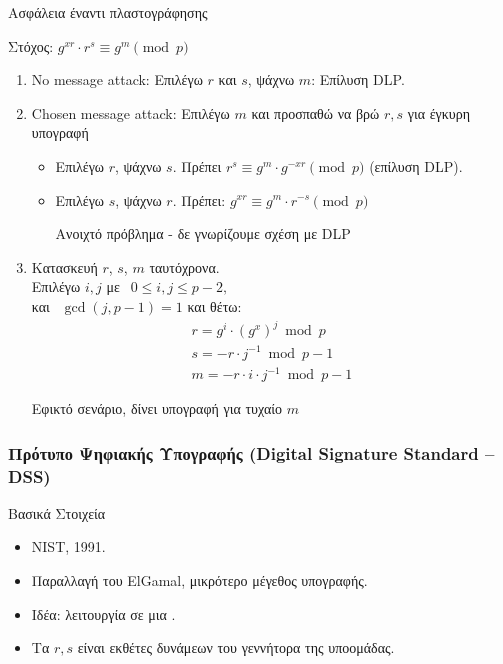 \documentclass{beamer}
\begin{document}
\begin{frame}[allowframebreaks]{Ασφάλεια έναντι πλαστογράφησης}

\alert{Στόχος: $g^{xr} \cdot r^s \equiv g^{m} \pmod p$}

\begin{enumerate}
\item No message attack: Επιλέγω $r$ και $s$, ψάχνω $m$: Επίλυση DLP.

\item Chosen message attack: Επιλέγω $m$ και προσπαθώ να βρώ $r,s$ για έγκυρη υπογραφή
\begin{itemize}
\item Επιλέγω $r$, ψάχνω $s$. Πρέπει
$r^s \equiv g^{m} \cdot g^{-xr} \pmod p$ (επίλυση DLP).

\item Επιλέγω $s$, ψάχνω $r$. Πρέπει:
$g^{xr}  \equiv g^{m} \cdot r^{-s} \pmod p$

Ανοιχτό πρόβλημα - δε γνωρίζουμε σχέση με DLP 
\end{itemize}
 
 
\framebreak

\item Κατασκευή $r$, $s$, $m$ ταυτόχρονα.\\
Επιλέγω $i,j$
με $ \ \ 0\leq i,j \leq p-2, $\\
και $ \ \  \gcd(j,p-1)=1$  και θέτω: \\
\begin{align*}
 r=g^{i} \cdot (g^{x})^j \bmod p \\
 s = -r\cdot j^{-1} \bmod {p-1} \\
 m = -r\cdot i\cdot j^{-1} \bmod {p-1}
\end{align*}


\alert{Εφικτό σενάριο, δίνει υπογραφή για τυχαίο $m$}


\end{enumerate}
 
\end{frame}

\begin{frame}
\frametitle{Πρότυπο Ψηφιακής Υπογραφής (Digital Signature Standard -- DSS)} 

\begin{block}{Βασικά Στοιχεία}
\begin{itemize}
\item NIST, 1991.
\pause
\item Παραλλαγή του ElGamal, μικρότερο μέγεθος υπογραφής.
\pause
\item Ιδέα: λειτουργία σε μια .
\pause
\item Τα $r, s$ είναι εκθέτες δυνάμεων του γεννήτορα της υποομάδας.
\end{itemize}
\end{block}
\end{frame}
\end{document}
